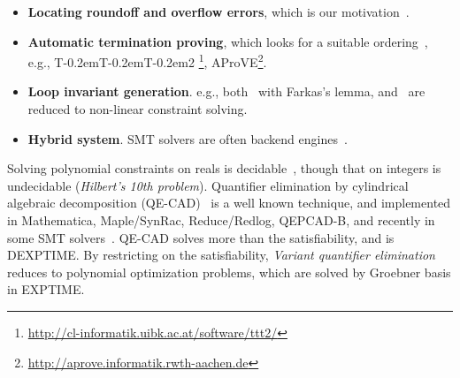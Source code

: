 \documentclass[runningheads,a4paper,oribibl]{llncs}
\newcommand\TTTT{%
 \textsf{T\kern-0.2em\raisebox{-0.3em}T\kern-0.2emT\kern-0.2em\raisebox{-0.3em}2}%
}
\begin{document}
\begin{itemize}
\item {\bf Locating roundoff and overflow errors}, 
which is our motivation~\cite{Ngoc:2009:ORE:1685167.1685421}. 

\item {\bf Automatic termination proving}, 
which looks for a suitable ordering~\cite{Lucas:2008:CCS:1361735.1361760}, 
e.g., \TTTT\footnote{\url{http://cl-informatik.uibk.ac.at/software/ttt2/}}, 
AProVE\footnote{\url{http://aprove.informatik.rwth-aachen.de}}. 

\item {\bf Loop invariant generation}. 
e.g., both~\cite{Colon} with Farkas's lemma, %
and~\cite{Sankaranarayanan:2004:NLI:982962.964028} are reduced to non-linear constraint solving.

\item {\bf Hybrid system}. SMT solvers are often backend engines~\cite{Sankaranarayanan04constructinginvariants}. 
\end{itemize}	

Solving polynomial constraints on reals is decidable~\cite{tarski}, 
though that on integers is undecidable ({\em Hilbert's 10th problem}). 
Quantifier elimination by cylindrical algebraic decomposition (QE-CAD)~\cite{qecad} 
is a well known technique, and 
implemented in Mathematica, Maple/SynRac, Reduce/Redlog, QEPCAD-B, and recently 
in some SMT solvers~\cite{Jovanovic13,smtrat}.   %
QE-CAD solves more than the satisfiability, and is DEXPTIME. %
By restricting on the satisfiability, {\em Variant quantifier elimination}~\cite{Hong2012883} reduces to 
polynomial optimization problems, which are solved by Groebner basis in EXPTIME. 
\end{document}
